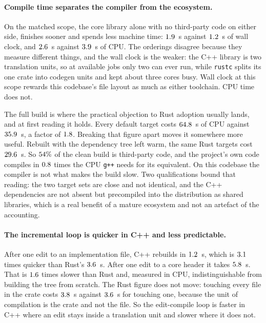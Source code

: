 \documentclass[english,oneside,a4paper,censored,csm,software-track-2020]{HYthesisML}
\begin{document}
\paragraph{Compile time separates the compiler from the ecosystem.}
On the matched scope, the core library alone with no third-party code on either side,
\BuildLibWallFaster{} finishes sooner and \BuildLibCpuCheaper{} spends less machine time:
$1.9$~s against $1.2$~s of wall clock, and $2.6$~s against
$3.9$~s of CPU. The orderings disagree because they measure different things, and
the wall clock is the weaker: the C++ library is two translation units, so at \AdoptJobs{} available
jobs only two can ever run, while \texttt{rustc} splits its one crate into codegen units and kept
about three cores busy. Wall clock at this scope rewards this codebase's file layout as much as
either toolchain. CPU time does not.

The full build is where the practical objection to Rust adoption usually lands, and at first
reading it holds. Every default target costs $64.8$~s of CPU against
$35.9$~s, a factor of $1.8$. Breaking that figure apart moves it somewhere
more useful. Rebuilt with the dependency tree left warm, the same Rust targets cost
$29.6$~s. So $54\%$ of the clean build is third-party code, and
the project's own code compiles in $0.8$ times the CPU \texttt{g++} needs
for its equivalent. On this codebase the compiler is not what makes the build slow. Two
qualifications bound that reading: the two target sets are close and not identical, and the C++
dependencies are not absent but precompiled into the distribution as shared libraries, which
is a real benefit of a mature ecosystem and not an artefact of the accounting.

\paragraph{The incremental loop is quicker in C++ and less predictable.}
After one edit to an implementation file, C++ rebuilds in $1.2$~s, which is
$3.1$ times quicker than Rust's $3.6$~s. After one edit to a core header it
takes $5.8$~s. That is $1.6$ times slower than Rust and, measured
in CPU, indistinguishable from building the tree from scratch. The Rust figure does not move:
touching every file in the crate costs $3.8$~s against $3.6$~s for
touching one, because the unit of compilation is the crate and not the file. So the edit-compile
loop is faster in C++ where an edit stays inside a translation unit and slower where it does not.
\end{document}
